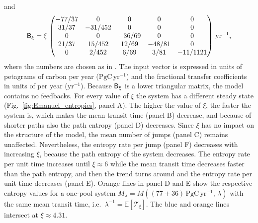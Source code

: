 \documentclass[smallextended]{svjour3}
\newcommand{\E}{\mathbb{E}}
\newcommand{\TT}{\mathcal{T}}
\newcommand{\peta}{\mathrm{P}}
\newcommand{\gC}{\mathrm{gC}}
\newcommand{\yr}{\mathrm{yr}}
\newcommand{\ie}{i.e.}
\begin{document}
and
\begin{equation*}
    \tens{B}_\xi = \xi\,\left(\begin{matrix}
      -77/37 &       0 &      0 &      0 & 	  0\\
       31/37 & -31/452 &      0 &      0 & 	  0\\
	   0 &       0 & -36/69 &      0 & 	  0\\
       21/37 &  15/452 &  12/69 & -48/81 & 	  0\\
	   0 &   2/452 &   6/69 &   3/81 & -11/1121
	 \end{matrix}\right)\,\yr^{-1},
\end{equation*}
where the numbers are chosen as in \citet{Thompson1999GCB}. 
The input vector is expressed in units of petagrams of carbon per year ($\peta\gC\,\yr^{-1}$) and the fractional transfer coefficients in units of per year ($\yr^{-1}$).
Because $\mathsf{B}_\xi$ is a lower triangular matrix, the model contains no feedbacks.
For every value of $\xi$ the system has a different steady state (Fig.~\ref{fig:Emanuel_entropies}, panel A).
The higher the value of $\xi$, the faster the system is, which makes the mean transit time (panel B) decrease, and because of shorter paths also the path entropy (panel D) decreases.
Since $\xi$ has no impact on the structure of the model, the mean number of jumps (panel C) remains unaffected.
Nevertheless, the entropy rate per jump (panel F) decreases with increasing $\xi$, because the path entropy of the system decreases.
The entropy rate per unit time increases until $\xi\approx6$ while the mean transit time decreases faster than the path entropy, and then the trend turns around and the entropy rate per unit time decreases (panel E).
Orange lines in panel D and E show the respective entropy values for a one-pool system $M_\lambda=M((77+36)\,\peta\gC\,\yr^{-1},\, \lambda)$ with the same mean transit time, \ie\ $\lambda^{-1} = \E\left[\TT_\xi\right]$.
The blue and orange lines intersect at $\xi\approx4.31$.
\end{document}
